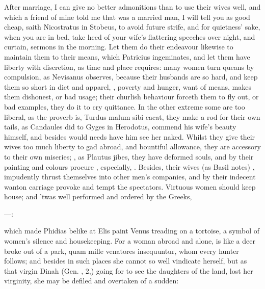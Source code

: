 After marriage, I can give no better admonitions than to use their
wives well, and which a friend of mine told me that was a married man,
I will tell you as good cheap, saith Nicostratus in Stobeus, to
avoid future strife, and for quietness' sake, when you are in bed, take
heed of your wife's flattering speeches over night, and curtain,
sermons in the morning. Let them do their endeavour likewise to
maintain them to their means, which Patricius ingeminates, and
let them have liberty with discretion, as time and place requires: many
women turn queans by compulsion, as Nevisanus observes, because
their husbands are so hard, and keep them so short in diet and apparel,
, poverty and hunger, want of means,
makes them dishonest, or bad usage; their churlish behaviour forceth
them to fly out, or bad examples, they do it to cry quittance. In the
other extreme some are too liberal, as the proverb is, Turdus malum
sibi cacat, they make a rod for their own tails, as Candaules did to
Gyges in Herodotus, commend his wife's beauty himself, and
besides would needs have him see her naked. Whilst they give their
wives too much liberty to gad abroad, and bountiful allowance, they are
accessory to their own miseries; , as
Plautus jibes, they have deformed souls, and by their painting and
colours procure , especially, . Besides,
their wives (as Basil notes) , impudently
thrust themselves into other men's companies, and by their indecent wanton
carriage provoke and tempt the spectators. Virtuous women should keep house;
and 'twas well performed and ordered by the Greeks,

---:

which made Phidias belike at Elis paint Venus treading on a tortoise, a
symbol of women's silence and housekeeping. For a woman abroad and
alone, is like a deer broke out of a park, quam mille venatores
insequuntur, whom every hunter follows; and besides in such places she
cannot so well vindicate herself, but as that virgin Dinah (Gen.
, 2,) going for to see the daughters of the land, lost her
virginity, she may be defiled and overtaken of a sudden: 

